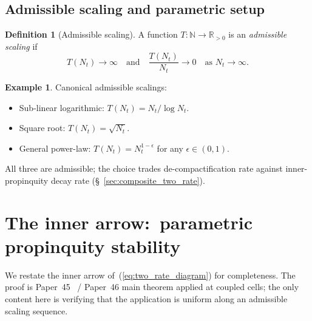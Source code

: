 \documentclass[11pt,a4paper]{article}
\theoremstyle{plain}
\theoremstyle{definition}
\newtheorem{definition}[theorem]{Definition}
\newtheorem{example}[theorem]{Example}
\newcommand{\Nt}{N_{t}}
\newcommand{\R}{\mathbb{R}}
\newcommand{\N}{\mathbb{N}}
\begin{document}
\subsection{Admissible scaling and parametric setup}
\label{sec:setup_scaling}

\begin{definition}[Admissible scaling]\label{def:admissible_scaling}
A function $T : \N \to \R_{>0}$ is an \emph{admissible scaling} if
\begin{equation}\label{eq:admissible_scaling_def}
T(\Nt) \to \infty \quad \text{and} \quad
\frac{T(\Nt)}{\Nt} \to 0 \quad \text{as } \Nt \to \infty.
\end{equation}
\end{definition}

\begin{example}
Canonical admissible scalings:
\begin{itemize}
\item Sub-linear logarithmic: $T(\Nt) = \Nt/\log\Nt$.
\item Square root: $T(\Nt) = \sqrt{\Nt}$.
\item General power-law: $T(\Nt) = \Nt^{1-\epsilon}$ for any
$\epsilon \in (0, 1)$.
\end{itemize}
All three are admissible; the choice trades de-compactification rate
against inner-propinquity decay rate
(\S~\ref{sec:composite_two_rate}).
\end{example}

\section{The inner arrow:\ parametric propinquity stability}
\label{sec:inner}

We restate the inner arrow of~(\ref{eq:two_rate_diagram}) for
completeness. The proof is Paper~45~\cite{paper45} / Paper~46
\cite{paper46} main theorem applied at coupled cells; the only
content here is verifying that the application is uniform along an
admissible scaling sequence.
\end{document}
